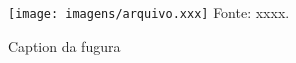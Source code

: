 \begin{figure}[H]
  \centering
  \caption{Caption da fugura}
  \label{fig:label}
    \texttt{[image: imagens/arquivo.xxx]}
  \footnotesize{Fonte: xxxx.}
\end{figure}

